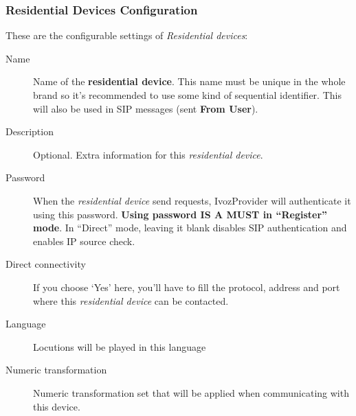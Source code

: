 \documentclass[letterpaper,10pt,spanish]{sphinxmanual}
\begin{document}
\subsubsection{Residential Devices Configuration}
\label{administration_portal/client/residential/residential_devices:residential-devices-configuration}
These are the configurable settings of \emph{Residential devices}:
\begin{description}
\item[{Name}] \leavevmode{}\label{administration_portal/client/residential/residential_devices:term-name}
Name of the \textbf{residential device}. This name must be unique in the whole brand so
it's recommended to use some kind of sequential identifier. This will also be used
in SIP messages (sent \textbf{From User}).

\item[{Description}] \leavevmode{}\label{administration_portal/client/residential/residential_devices:term-description}
Optional. Extra information for this \emph{residential device}.

\item[{Password}] \leavevmode{}\label{administration_portal/client/residential/residential_devices:term-password}
When the \emph{residential device} send requests, IvozProvider will authenticate it using
this password. \textbf{Using password IS A MUST in ``Register'' mode}. In ``Direct'' mode,
leaving it blank disables SIP authentication and enables IP source check.

\item[{Direct connectivity}] \leavevmode{}\label{administration_portal/client/residential/residential_devices:term-direct-connectivity}
If you choose `Yes' here, you'll have to fill the protocol, address and
port where this \emph{residential device} can be contacted.

\item[{Language}] \leavevmode{}\label{administration_portal/client/residential/residential_devices:term-language}
Locutions will be played in this language

\item[{Numeric transformation}] \leavevmode{}\label{administration_portal/client/residential/residential_devices:term-numeric-transformation}
Numeric transformation set that will be applied when communicating with this device.


\end{description}
\end{document}
